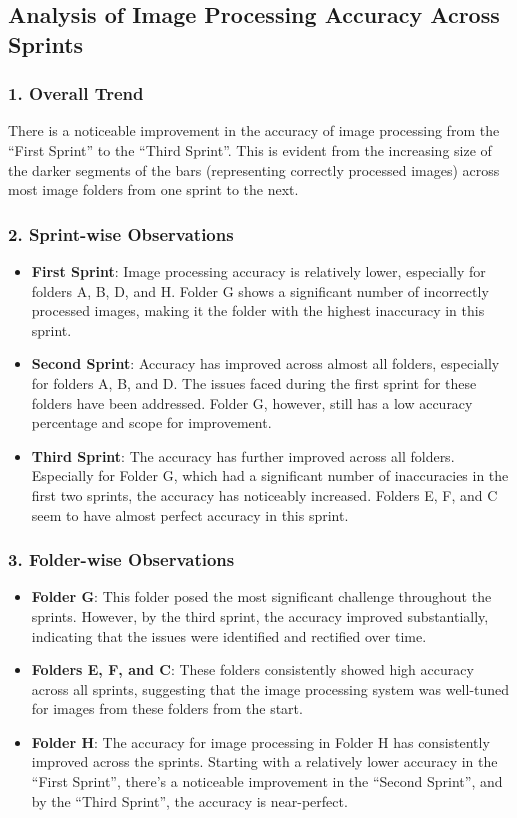 \subsection{Analysis of Image Processing Accuracy Across Sprints}

\subsubsection*{1. Overall Trend}
There is a noticeable improvement in the accuracy of image processing from the ``First Sprint'' to the ``Third Sprint''. This is evident from the increasing size of the darker segments of the bars (representing correctly processed images) across most image folders from one sprint to the next.

\subsubsection*{2. Sprint-wise Observations}
\begin{itemize}
    \item \textbf{First Sprint}: Image processing accuracy is relatively lower, especially for folders A, B, D, and H. Folder G shows a significant number of incorrectly processed images, making it the folder with the highest inaccuracy in this sprint.
    \item \textbf{Second Sprint}: Accuracy has improved across almost all folders, especially for folders A, B, and D. The issues faced during the first sprint for these folders have been addressed. Folder G, however, still has a low accuracy percentage and scope for improvement.
    \item \textbf{Third Sprint}: The accuracy has further improved across all folders. Especially for Folder G, which had a significant number of inaccuracies in the first two sprints, the accuracy has noticeably increased. Folders E, F, and C seem to have almost perfect accuracy in this sprint.
\end{itemize}

\subsubsection*{3. Folder-wise Observations}
\begin{itemize}
    \item \textbf{Folder G}: This folder posed the most significant challenge throughout the sprints. However, by the third sprint, the accuracy improved substantially, indicating that the issues were identified and rectified over time.
    \item \textbf{Folders E, F, and C}: These folders consistently showed high accuracy across all sprints, suggesting that the image processing system was well-tuned for images from these folders from the start.
    \item \textbf{Folder H}: The accuracy for image processing in Folder H has consistently improved across the sprints. Starting with a relatively lower accuracy in the ``First Sprint'', there's a noticeable improvement in the ``Second Sprint'', and by the ``Third Sprint'', the accuracy is near-perfect.
\end{itemize}



